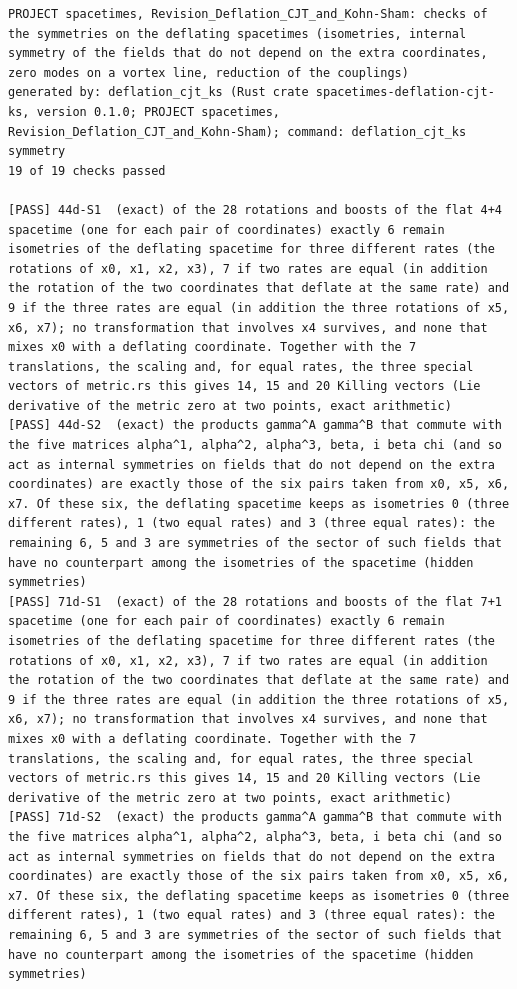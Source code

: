 \documentclass[
  10pt,
]{article}
\begin{document}
\begin{verbatim}
PROJECT spacetimes, Revision_Deflation_CJT_and_Kohn-Sham: checks of the symmetries on the deflating spacetimes (isometries, internal symmetry of the fields that do not depend on the extra coordinates, zero modes on a vortex line, reduction of the couplings)
generated by: deflation_cjt_ks (Rust crate spacetimes-deflation-cjt-ks, version 0.1.0; PROJECT spacetimes, Revision_Deflation_CJT_and_Kohn-Sham); command: deflation_cjt_ks symmetry
19 of 19 checks passed

[PASS] 44d-S1  (exact) of the 28 rotations and boosts of the flat 4+4 spacetime (one for each pair of coordinates) exactly 6 remain isometries of the deflating spacetime for three different rates (the rotations of x0, x1, x2, x3), 7 if two rates are equal (in addition the rotation of the two coordinates that deflate at the same rate) and 9 if the three rates are equal (in addition the three rotations of x5, x6, x7); no transformation that involves x4 survives, and none that mixes x0 with a deflating coordinate. Together with the 7 translations, the scaling and, for equal rates, the three special vectors of metric.rs this gives 14, 15 and 20 Killing vectors (Lie derivative of the metric zero at two points, exact arithmetic)
[PASS] 44d-S2  (exact) the products gamma^A gamma^B that commute with the five matrices alpha^1, alpha^2, alpha^3, beta, i beta chi (and so act as internal symmetries on fields that do not depend on the extra coordinates) are exactly those of the six pairs taken from x0, x5, x6, x7. Of these six, the deflating spacetime keeps as isometries 0 (three different rates), 1 (two equal rates) and 3 (three equal rates): the remaining 6, 5 and 3 are symmetries of the sector of such fields that have no counterpart among the isometries of the spacetime (hidden symmetries)
[PASS] 71d-S1  (exact) of the 28 rotations and boosts of the flat 7+1 spacetime (one for each pair of coordinates) exactly 6 remain isometries of the deflating spacetime for three different rates (the rotations of x0, x1, x2, x3), 7 if two rates are equal (in addition the rotation of the two coordinates that deflate at the same rate) and 9 if the three rates are equal (in addition the three rotations of x5, x6, x7); no transformation that involves x4 survives, and none that mixes x0 with a deflating coordinate. Together with the 7 translations, the scaling and, for equal rates, the three special vectors of metric.rs this gives 14, 15 and 20 Killing vectors (Lie derivative of the metric zero at two points, exact arithmetic)
[PASS] 71d-S2  (exact) the products gamma^A gamma^B that commute with the five matrices alpha^1, alpha^2, alpha^3, beta, i beta chi (and so act as internal symmetries on fields that do not depend on the extra coordinates) are exactly those of the six pairs taken from x0, x5, x6, x7. Of these six, the deflating spacetime keeps as isometries 0 (three different rates), 1 (two equal rates) and 3 (three equal rates): the remaining 6, 5 and 3 are symmetries of the sector of such fields that have no counterpart among the isometries of the spacetime (hidden symmetries)

\end{verbatim}
\end{document}
